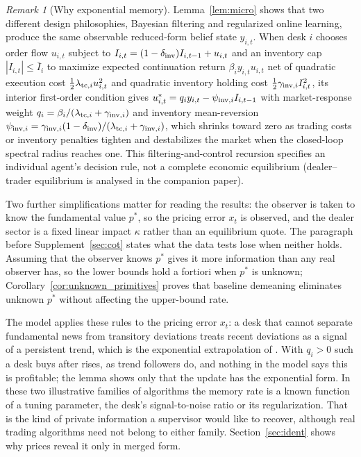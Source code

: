 \documentclass[12pt]{article}
\theoremstyle{definition}
\theoremstyle{remark}
\newtheorem{remark}[theorem]{Remark}
\begin{document}
\begin{remark}[Why exponential memory]
Lemma~\ref{lem:micro} shows that two different design philosophies, Bayesian filtering and regularized online learning, produce the same observable reduced-form belief state $y_{i,t}$. When desk $i$ chooses order flow $u_{i,t}$ subject to $I_{i,t}=(1-\delta_{\rm inv})I_{i,t-1}+u_{i,t}$ and an inventory cap $|I_{i,t}|\le\bar I_i$ to maximize expected continuation return $\beta_i y_{i,t}u_{i,t}$ net of quadratic execution cost $\tfrac12\lambda_{{\rm tc},i}u_{i,t}^2$ and quadratic inventory holding cost $\tfrac12\gamma_{{\rm inv},i}I_{i,t}^2$, its interior first-order condition gives $u_{i,t}^*=q_iy_{i,t}-\psi_{{\rm inv},i}I_{i,t-1}$ with market-response weight $q_i=\beta_i/(\lambda_{{\rm tc},i}+\gamma_{{\rm inv},i})$ and inventory mean-reversion $\psi_{{\rm inv},i}=\gamma_{{\rm inv},i}(1-\delta_{\rm inv})/(\lambda_{{\rm tc},i}+\gamma_{{\rm inv},i})$, which shrinks toward zero as trading costs or inventory penalties tighten and destabilizes the market when the closed-loop spectral radius reaches one. This filtering-and-control recursion specifies an individual agent's decision rule, not a complete economic equilibrium (dealer--trader equilibrium is analysed in the companion paper).

Two further simplifications matter for reading the results: the observer is taken to know the fundamental value $p^*$, so the pricing error $x_t$ is observed, and the dealer sector is a fixed linear impact $\kappa$ rather than an equilibrium quote. The paragraph before Supplement~\ref{sec:cot} states what the data tests lose when neither holds. Assuming that the observer knows $p^*$ gives it more information than any real observer has, so the lower bounds hold a fortiori when $p^*$ is unknown; Corollary~\ref{cor:unknown_primitives} proves that baseline demeaning eliminates unknown $p^*$ without affecting the upper-bound rate.

The model applies these rules to the pricing error $x_t$: a desk that cannot separate fundamental news from transitory deviations treats recent deviations as a signal of a persistent trend, which is the exponential extrapolation of \citet{barberis2015,barberis2018}. With $q_i>0$ such a desk buys after rises, as trend followers do, and nothing in the model says this is profitable; the lemma shows only that the update has the exponential form. In these two illustrative families of algorithms the memory rate is a known function of a tuning parameter, the desk's signal-to-noise ratio or its regularization. That is the kind of private information a supervisor would like to recover, although real trading algorithms need not belong to either family. Section~\ref{sec:ident} shows why prices reveal it only in merged form.
\end{remark}
\end{document}
